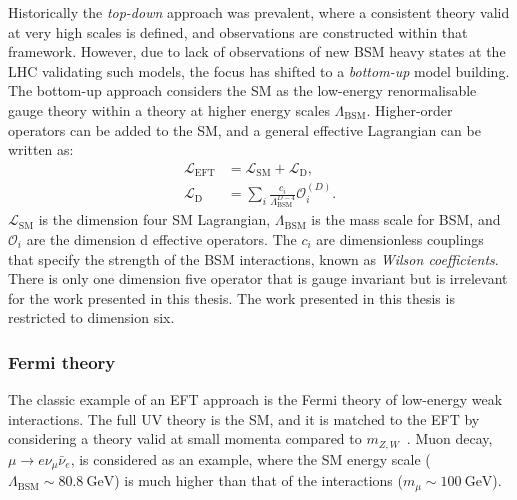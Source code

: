 Historically the \emph{top-down} approach was prevalent, where a consistent theory valid at very high scales is defined, and observations are constructed within that framework. However, due to lack of observations of new BSM heavy states at the LHC validating such models, the focus has shifted to a \emph{bottom-up} model building. The bottom-up approach considers the SM as the low-energy renormalisable gauge theory within a theory at higher energy scales $\Lambda_{\mathrm{BSM}}$. Higher-order operators can be added to the SM, and a general effective Lagrangian can be written as: 
\begin{equation}
    \label{eq:eftLagrangian}
    \begin{aligned}
        \mathcal{L}_\mathrm{EFT} &=  \mathcal{L}_\mathrm{SM} +  \mathcal{L}_\mathrm{D},\\
        \mathcal{L}_\mathrm{D}   &= \sum_i \frac{c_i}{\Lambda_{\mathrm{BSM}}^{D-4}}\mathcal{O}^{(D)}_i.
     \end{aligned}
\end{equation}
$\mathcal{L}_\mathrm{SM}$ is the dimension four SM Lagrangian, $\Lambda_{\mathrm{BSM}}$ is the mass scale for BSM, and $\mathcal{O}_i$ are the dimension d effective operators. The $c_i$ are dimensionless couplings that specify the strength of the BSM interactions, known as \emph{Wilson coefficients}. There is only one dimension five operator that is gauge invariant but is irrelevant for the work presented in this thesis. The work presented in this thesis is restricted to dimension six. 

\subsubsection{Fermi theory}
The classic example of an EFT approach is the Fermi theory of low-energy weak interactions. The full UV theory is the SM, and it is matched to the EFT by considering a theory valid at small momenta compared to $m_{Z,W}$~\cite{manohar2018introduction}. Muon decay, $\mu \rightarrow e\nu_\mu\bar{\nu}_e$, is considered as an example, where the SM energy scale ($\Lambda_{\mathrm{BSM}}\sim\SI{80.8}{\giga\electronvolt}$) is much higher than that of the interactions ($m_\mu \sim \SI{100}{\giga\electronvolt}$). 

